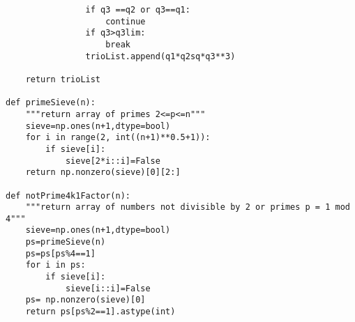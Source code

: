 \documentclass[11pt, oneside]{article}   	%
\begin{document}
\begin{verbatim}
                if q3 ==q2 or q3==q1:
                    continue
                if q3>q3lim:
                    break                
                trioList.append(q1*q2sq*q3**3)
                
    return trioList

def primeSieve(n):
    """return array of primes 2<=p<=n"""
    sieve=np.ones(n+1,dtype=bool)
    for i in range(2, int((n+1)**0.5+1)):
        if sieve[i]:
            sieve[2*i::i]=False
    return np.nonzero(sieve)[0][2:]

def notPrime4k1Factor(n):
    """return array of numbers not divisible by 2 or primes p = 1 mod 4"""
    sieve=np.ones(n+1,dtype=bool)
    ps=primeSieve(n)
    ps=ps[ps%4==1]
    for i in ps:
        if sieve[i]:
            sieve[i::i]=False
    ps= np.nonzero(sieve)[0]    
    return ps[ps%2==1].astype(int)
\end{verbatim}
\end{document}

